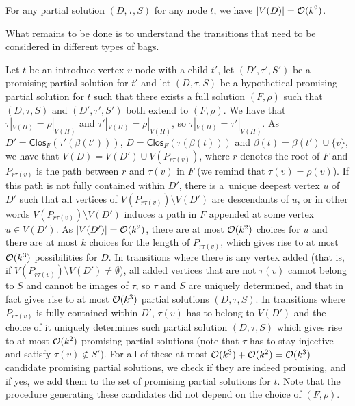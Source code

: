 \documentclass[a4paper,11pt]{article}
\begin{document}
\begin{observation} \label{obs:partial-size}
For any partial solution $(D, \tau, S)$ for any node $t$, we have $|V(D)| = {\mathcal{O}}(k^2)$.
\end{observation}

What remains to be done is to understand the transitions that need to be considered in different types of bags.

\begin{description}[leftmargin=0pt]
    \item[Introduce vertex.] Let $t$ be an introduce vertex $v$ node with a child $t'$, let $(D', \tau', S')$ be a promising partial solution for $t'$ and let $(D, \tau, S)$ be a hypothetical promising partial solution for $t$ such that there exists a full solution $(F, \rho)$ such that $(D, \tau, S)$ and $(D', \tau', S')$ both extend to $(F, \rho)$. We have that $\tau|_{V(H)} = \rho|_{V(H)}$ and $\tau'|_{V(H)} = \rho|_{V(H)}$, so $\tau|_{V(H)} = \tau'|_{V(H)}$.
    As $D' = \mathsf{Clos}_F(\tau'(\beta(t')))$, $D = \mathsf{Clos}_F(\tau(\beta(t)))$ and $\beta(t) = \beta(t') \cup \{v\}$, we have that $V(D) = V(D') \cup V(P_{r \tau(v)})$, where $r$ denotes the root of $F$ and $P_{r \tau(v)}$ is the path 
    between $r$
    and $\tau(v)$ in $F$ (we remind that $\tau(v) = \rho(v)$). 
    If this path is not fully contained within $D'$, there is a~unique deepest vertex $u$ of $D'$ such that all vertices of $V(P_{r \tau(v)}) \setminus V(D')$ are descendants of $u$, or in other words $V(P_{r \tau(v)}) \setminus V(D')$ induces a path in $F$ appended at some vertex $u \in V(D')$. As $|V(D')| = {\mathcal{O}}(k^2)$, there are at most ${\mathcal{O}}(k^2)$ choices for $u$ and there are at most $k$ choices for the length of $P_{r \tau(v)}$, which gives rise to at most ${\mathcal{O}}(k^3)$ possibilities for $D$. In transitions where there is any vertex added (that is, if $V(P_{r \tau(v)}) \setminus V(D') \neq \emptyset$), all added vertices that are not $\tau(v)$ cannot belong to $S$ and cannot be images of $\tau$, so $\tau$ and $S$ are uniquely determined, and that in fact gives rise to at most ${\mathcal{O}}(k^3)$ partial solutions $(D, \tau, S)$. In transitions where $P_{r \tau(v)}$ is fully contained within $D'$, $\tau(v)$ has to belong to $V(D')$ and the choice of it uniquely determines such partial solution $(D, \tau, S)$ which gives rise to at most ${\mathcal{O}}(k^2)$ promising partial solutions (note that $\tau$ has to stay injective and satisfy $\tau(v) \not\in S'$). For all of these at most ${\mathcal{O}}(k^3)+{\mathcal{O}}(k^2) = {\mathcal{O}}(k^3)$ candidate promising partial solutions, we check if they are indeed promising, and if yes, we add them to the set of promising partial solutions for $t$. Note that the procedure generating these candidates did not depend on the choice of $(F, \rho)$.


\end{description}
\end{document}
